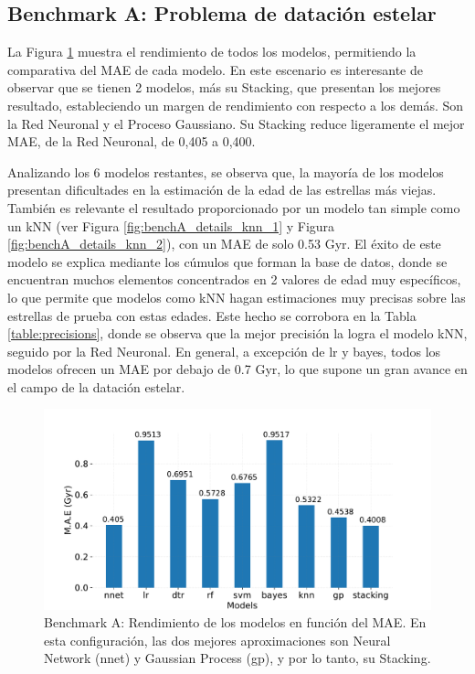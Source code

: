 \subsection{Benchmark A: Problema de datación estelar}

La Figura \ref{fig:benchA_models} muestra el rendimiento de todos los modelos, permitiendo la comparativa del MAE de cada modelo. En este escenario es interesante de observar que se tienen 2 modelos, más su Stacking, que presentan los mejores resultado, estableciendo un margen de rendimiento con respecto a los demás. Son la Red Neuronal y el Proceso Gaussiano. Su Stacking reduce ligeramente el mejor MAE, de la Red Neuronal, de 0,405 a 0,400.

Analizando los 6 modelos restantes, se observa que, la mayoría de los modelos presentan dificultades en la estimación de la edad de las estrellas más viejas. También es relevante el resultado proporcionado por un modelo tan simple como un kNN (ver Figura \ref{fig:benchA_details_knn_1} y Figura \ref{fig:benchA_details_knn_2}), con un MAE de solo 0.53 Gyr. El éxito de este modelo se explica mediante los cúmulos que forman la base de datos, donde se encuentran muchos elementos concentrados en 2 valores de edad muy específicos, lo que permite que modelos como kNN hagan estimaciones muy precisas sobre las estrellas de prueba con estas edades. Este hecho se corrobora en la Tabla \ref{table:precisions}, donde se observa que la mejor precisión la logra el modelo kNN, seguido por la Red Neuronal. En general, a excepción de lr y bayes, todos los modelos ofrecen un MAE por debajo de 0.7 Gyr, lo que supone un gran avance en el campo de la datación estelar.

\begin{figure}[H]
\begin{center}
 \includegraphics[width=0.8\linewidth]{Figuras/Experimentos/B_A_models.pdf}
\end{center}
\caption{Benchmark A: Rendimiento de los modelos en función del MAE. En esta configuración, las dos mejores aproximaciones son Neural Network (nnet) y Gaussian Process (gp), y por lo tanto, su Stacking.}
 \label{fig:benchA_models}
\end{figure}

